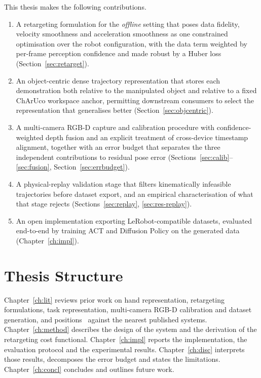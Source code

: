 This thesis makes the following contributions.

\begin{enumerate}[leftmargin=2em]
  \item A retargeting formulation for the \emph{offline} setting that poses
        data fidelity, velocity smoothness and acceleration smoothness as one
        constrained optimisation over the robot configuration, with the data
        term weighted by per-frame perception confidence and made robust by a
        Huber loss (Section~\ref{sec:retarget}).
  \item An object-centric dense trajectory representation that stores each
        demonstration both relative to the manipulated object and relative to a
        fixed ChArUco workspace anchor, permitting downstream consumers to
        select the representation that generalises better
        (Section~\ref{sec:objcentric}).
  \item A multi-camera RGB-D capture and calibration procedure with
        confidence-weighted depth fusion and an explicit treatment of
        cross-device timestamp alignment, together with an error budget that
        separates the three independent contributions to residual pose error
        (Sections~\ref{sec:calib}--\ref{sec:fusion}, Section~\ref{sec:errbudget}).
  \item A physical-replay validation stage that filters kinematically
        infeasible trajectories before dataset export, and an empirical
        characterisation of what that stage rejects
        (Sections~\ref{sec:replay}, \ref{sec:res-replay}).
  \item An open implementation exporting LeRobot-compatible datasets, evaluated
        end-to-end by training ACT and Diffusion Policy on the generated data
        (Chapter~\ref{ch:impl}).
\end{enumerate}

\section{Thesis Structure}
\label{sec:structure}

Chapter~\ref{ch:lit} reviews prior work on hand representation, retargeting
formulations, task representation, multi-camera RGB-D calibration and dataset
generation, and positions \viki\ against the nearest published systems.
Chapter~\ref{ch:method} describes the design of the system and the derivation
of the retargeting cost functional. Chapter~\ref{ch:impl} reports the
implementation, the evaluation protocol and the experimental results.
Chapter~\ref{ch:disc} interprets those results, decomposes the error budget and
states the limitations. Chapter~\ref{ch:concl} concludes and outlines future
work.
